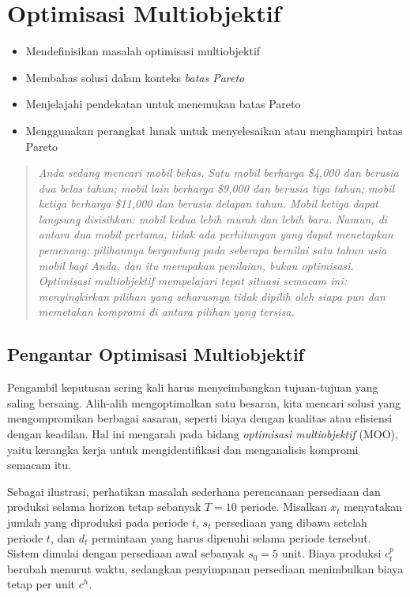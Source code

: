 \chapter{Optimisasi Multiobjektif}
\label{ch:multi-objective}

\begin{outcome}
\begin{itemize}
    \item Mendefinisikan masalah optimisasi multiobjektif
    \item Membahas solusi dalam konteks \emph{batas Pareto}
    \item Menjelajahi pendekatan untuk menemukan batas Pareto
    \item Menggunakan perangkat lunak untuk menyelesaikan atau menghampiri batas Pareto
\end{itemize}
\end{outcome}

\begin{quote}
\itshape Anda sedang mencari mobil bekas. Satu mobil berharga \$4{,}000 dan berusia dua belas tahun; mobil lain berharga \$9{,}000 dan berusia tiga tahun; mobil ketiga berharga \$11{,}000 dan berusia delapan tahun. Mobil ketiga dapat langsung disisihkan: mobil kedua lebih murah \emph{dan} lebih baru. Namun, di antara dua mobil pertama, tidak ada perhitungan yang dapat menetapkan pemenang: pilihannya bergantung pada seberapa bernilai satu tahun usia mobil bagi Anda, dan itu merupakan penilaian, bukan optimisasi. Optimisasi multiobjektif mempelajari tepat situasi semacam ini: menyingkirkan pilihan yang seharusnya tidak dipilih oleh siapa pun dan memetakan kompromi di antara pilihan yang tersisa.
\end{quote}

\section{Pengantar Optimisasi Multiobjektif}

Pengambil keputusan sering kali harus menyeimbangkan tujuan-tujuan yang saling bersaing. Alih-alih mengoptimalkan satu besaran, kita mencari solusi yang mengompromikan berbagai sasaran, seperti biaya dengan kualitas atau efisiensi dengan keadilan. Hal ini mengarah pada bidang \emph{optimisasi multiobjektif} (MOO), yaitu kerangka kerja untuk mengidentifikasi dan menganalisis kompromi semacam itu.

Sebagai ilustrasi, perhatikan masalah sederhana perencanaan persediaan dan produksi selama horizon tetap sebanyak \(T = 10\) periode. Misalkan \(x_t\) menyatakan jumlah yang diproduksi pada periode \(t\), \(s_t\) persediaan yang dibawa setelah periode \(t\), dan \(d_t\) permintaan yang harus dipenuhi selama periode tersebut. Sistem dimulai dengan persediaan awal sebanyak \(s_0 = 5\) unit. Biaya produksi \(c^p_t\) berubah menurut waktu, sedangkan penyimpanan persediaan menimbulkan biaya tetap per unit \(c^h\).

